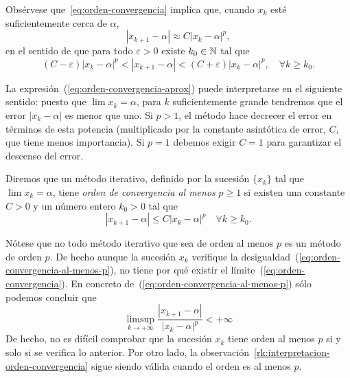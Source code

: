 Obsérvese que~\eqref{eq:orden-convergencia} implica que, cuando $x_k$
esté suficientemente cerca de $\alpha$,
\begin{equation}
  \label{eq:orden-convergencia-aprox}
   |x_{k+1}-\alpha| \approx C |x_{k}-\alpha|^p,
\end{equation}
en el sentido de que para todo $\varepsilon>0$ existe $k_0\in\operatorname{{\mathbb N}}$ tal que
\begin{equation*}
   \label{eq:orden-convergencia-2}
  (C-\varepsilon) |x_{k}-\alpha|^p < |x_{k+1}-\alpha| < 
  (C+\varepsilon)  |x_{k}-\alpha|^p, \quad \forall k \ge k_0.
\end{equation*}

\begin{remark}
\label{rk:interpretacion-orden-convergencia}
  La expresión~(\ref{eq:orden-convergencia-aprox}) puede interpretarse
  en el siguiente sentido: puesto que $\lim x_k=\alpha$, para $k$
  suficientemente grande tendremos que el error $|x_k-\alpha|$ es
  menor que uno. Si $p>1$, el método hace decrecer el error en
  términos de esta potencia (multiplicado por la constante asintótica
  de error, $C$, que tiene menos importancia). Si $p=1$ debemos exigir
  $C=1$ para garantizar el descenso del error.\label{rk:1}
\end{remark}

\begin{definition}
  Diremos que un método iterativo, definido por la sucesión $\{x_k\}$ tal
  que $\lim x_k=\alpha$, tiene \textit{orden de convergencia al menos}
  $p\ge 1$ si existen una constante $C>0$ y un número entero $k_0>0$
  tal que
  \begin{equation}
    \label{eq:orden-convergencia-al-menos-p}
    |x_{k+1}-\alpha| \le C |x_k-\alpha|^p \quad \forall k\ge k_0.
  \end{equation}
\end{definition}

  Nótese que no todo método iterativo que sea de orden al menos $p$ es
  un método de orden $p$. De hecho aunque la sucesión $x_k$ verifique
  la desigualdad~(\ref{eq:orden-convergencia-al-menos-p}), no tiene
  por qué existir el límite~(\ref{eq:orden-convergencia}). En concreto
  de~(\ref{eq:orden-convergencia-al-menos-p}) sólo podemos concluir
  que
  \begin{equation*}
   \limsup_{k\to+\infty} \frac{|x_{k+1}-\alpha|}{|x_k-\alpha|^p} < +\infty
  \end{equation*}
  De hecho, no es difícil comprobar que la sucesión $x_{k}$ tiene
  orden al menos $p$ si y solo si se verifica lo anterior.
  Por otro lado, la
  observación~\ref{rk:interpretacion-orden-convergencia} sigue siendo
  válida cuando el orden es al menos $p$.

